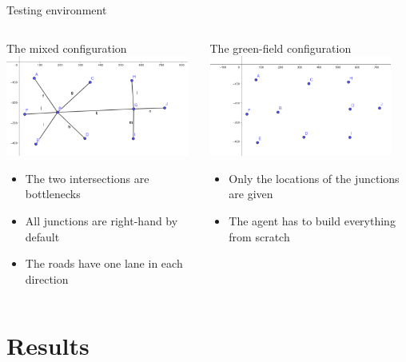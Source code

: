 \documentclass[english, aspectratio=169]{beamer}
\begin{document}
\begin{frame}{Testing environment}
\begin{columns}

\begin{column}{0.5\textwidth}
	\begin{center}
	The mixed configuration
	\includegraphics[width=6cm, keepaspectratio]{images/test_5_intersection.png}
	\end{center}
	\begin{itemize}
		\item The two intersections are bottlenecks
		\item All junctions are right-hand by default
		\item The roads have one lane in each direction
	\end{itemize}
\end{column}

\begin{column}{0.5\textwidth}
	\begin{center}
	The green-field configuration
	\includegraphics[width=6cm, keepaspectratio]{images/test_5_intersection_empty.png}
	\end{center}
	\begin{itemize}
		\item Only the locations of the junctions are given
		\item The agent has to build everything from scratch
	\end{itemize}
\end{column}

\end{columns}
\end{frame}


\section{Results}
\end{document}
